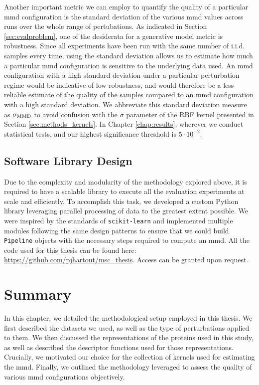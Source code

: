 Another important metric we can employ to quantify the quality of a particular
\acrshort{mmd} configuration is the standard deviation of the various
\acrshort{mmd} values across runs over the whole range of pertubations. As
indicated in Section \ref{sec:evalproblem}, one of the desiderata for a
generative model metric is robustness. Since all experiments have been run with
the same number of i.i.d. samples every time, using the standard deviation
allows us to estimate how much a particular \acrshort{mmd} configuration is sensitive
to the underlying data used. An \acrshort{mmd} configuration with a high standard
deviation under a particular perturbation regime would be indicative of low
robustness, and would therefore be a less reliable estimate of the quality of
the samples compared to an \acrshort{mmd} configuration with a high standard
deviation. We abbreviate this standard deviation measure as $\sigma_{\text{MMD}}$ to
avoid confusion with the $\sigma$ parameter of the RBF kernel presented in
Section \ref{sec:methods_kernels}. In Chapter \ref{chap:results}, wherever we
conduct statistical tests, and our highest significance threshold is $5\cdot 10^{-2}$.


\subsection{Software Library Design}

Due to the complexity and modularity of the methodology explored above, it is
required to have a scalable library to execute all the evaluation experiments at
scale and efficiently. To accomplish this task, we developed a custom Python
library leveraging parallel processing of data to the greatest extent possible.
We were inspired by the standards of \texttt{scikit-learn} and implemented
multiple modules following the same design patterns to ensure that we could
build \texttt{Pipeline} objects with the necessary steps required to compute an
\acrshort{mmd}. All the code used for this thesis can be found here:
\url{https://github.com/pjhartout/msc_thesis}. Access can be granted upon request.


\section{Summary}

In this chapter, we detailed the methodological setup employed in this thesis.
We first described the datasets we used, as well as the type of perturbations
applied to them. We then discussed the representations of the proteins used in
this study, as well as described the descriptor functions used for those
representations. Crucially, we motivated our choice for the collection of
kernels used for estimating the \acrshort{mmd}. Finally, we outlined the
methodology leveraged to assess the quality of various \acrshort{mmd}
configurations objectively.
